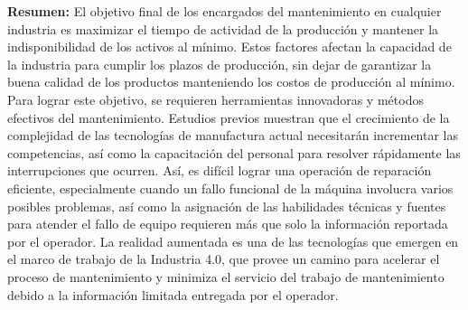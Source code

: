 \begin{description}
\item \textbf{Resumen:} El objetivo final de los encargados del mantenimiento en cualquier industria es maximizar el tiempo de actividad de la producción y mantener la indisponibilidad de los activos al mínimo. Estos factores afectan la capacidad de la industria para cumplir los plazos de producción, sin dejar de garantizar la buena calidad de los productos manteniendo los costos de producción al mínimo. Para lograr este objetivo, se requieren herramientas innovadoras y métodos efectivos del mantenimiento. Estudios previos muestran que el crecimiento de la complejidad de las tecnologías de manufactura actual necesitarán incrementar las competencias, así como la capacitación del personal para resolver rápidamente las interrupciones que ocurren. Así, es difícil lograr una operación de reparación eficiente, especialmente cuando un fallo funcional de la máquina involucra varios posibles problemas, así como la asignación  de las habilidades técnicas y fuentes para atender el fallo de equipo requieren más que solo la información reportada por el operador. La realidad aumentada es una de las tecnologías que emergen en el marco de trabajo de la Industria 4.0, que provee un camino para acelerar el proceso de mantenimiento y minimiza el servicio del trabajo de mantenimiento debido a la información limitada entregada por el operador.     
\end{description}

